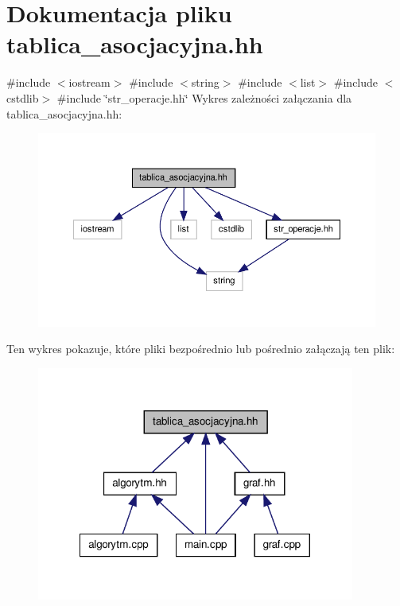 \hypertarget{tablica__asocjacyjna_8hh}{\section{\-Dokumentacja pliku tablica\-\_\-asocjacyjna.\-hh}
\label{tablica__asocjacyjna_8hh}
}
{\ttfamily \#include $<$iostream$>$}\*
{\ttfamily \#include $<$string$>$}\*
{\ttfamily \#include $<$list$>$}\*
{\ttfamily \#include $<$cstdlib$>$}\*
{\ttfamily \#include \char`\"{}str\-\_\-operacje.\-hh\char`\"{}}\*
\-Wykres zależności załączania dla tablica\-\_\-asocjacyjna.\-hh\-:\nopagebreak
\begin{figure}[H]
\begin{center}
\leavevmode
\includegraphics[width=350pt]{tablica__asocjacyjna_8hh__incl}
\end{center}
\end{figure}
\-Ten wykres pokazuje, które pliki bezpośrednio lub pośrednio załączają ten plik\-:\nopagebreak
\begin{figure}[H]
\begin{center}
\leavevmode
\includegraphics[width=296pt]{tablica__asocjacyjna_8hh__dep__incl}
\end{center}
\end{figure}

